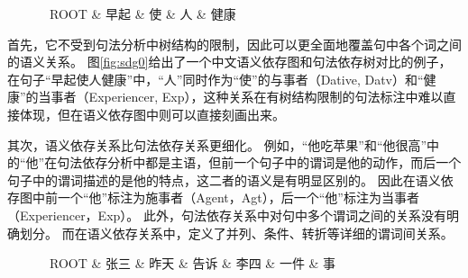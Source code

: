 \begin{figure}[htpb]
	\begin{center}
			\begin{dependency}[arc edge, arc angle=80, text only label, label style={above}]
				\begin{deptext} [row sep=0.6cm, column sep=.5cm]
					\ ROOT \& 早起 \& 使 \& 人 \&  健康 \\
				\end{deptext}
				
			\end{dependency}
	\end{center}
\end{figure}


首先，它不受到句法分析中树结构的限制，因此可以更全面地覆盖句中各个词之间的语义关系。
图\ref{fig:sdg0}给出了一个中文语义依存图和句法依存树对比的例子，在句子“早起使人健康”中，“人”同时作为“使”的与事者（Dative, Datv）和“健康”的当事者（Experiencer, Exp），这种关系在有树结构限制的句法标注中难以直接体现，但在语义依存图中则可以直接刻画出来。

其次，语义依存关系比句法依存关系更细化。
例如，“他吃苹果”和“他很高”中的“他”在句法依存分析中都是主语，但前一个句子中的谓词是他的动作，而后一个句子中的谓词描述的是他的特点，这二者的语义是有明显区别的。
因此在语义依存图中前一个“他”标注为施事者（Agent，Agt），后一个“他”标注为当事者（Experiencer，Exp）。
此外，句法依存关系中对句中多个谓词之间的关系没有明确划分。
而在语义依存关系中，定义了并列、条件、转折等详细的谓词间关系。

\begin{figure}[htb]
	\begin{center}
			\begin{dependency}[arc edge, arc angle=80, text only label, label style={above}]
				\begin{deptext} [row sep=0.4cm, column sep=.1cm]
					\ ROOT \& 张三 \& 昨天 \& 告诉 \&  李四  \& 一件 \& 事 \\
				\end{deptext}
			\end{dependency}
	\end{center}
\end{figure}

